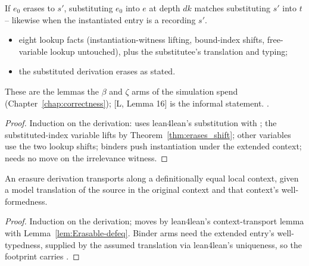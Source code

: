 \begin{theorem}
\label{thm:erases_subst}
\leanok
{}
 If $e_0$ erases to $s'$, substituting $e_0$ into $e$ at depth $\mathit{dk}$ matches substituting $s'$ into $t$ -- likewise when the instantiated entry is a  recording $s'$.
\begin{itemize}
\item {} eight lookup facts (instantiation-witness lifting, bound-index shifts, free-variable lookup untouched), plus the substitutee's translation and typing;
\item {} the substituted derivation erases as stated.
\end{itemize}
 These are the lemmas the $\beta$ and $\zeta$ arms of the simulation spend (Chapter~\ref{chap:correctness}); [L, Lemma 16] is the informal statement.
 \stProved{}.
\end{theorem}
\begin{proof}
\leanok
{}
 Induction on the derivation:  uses lean4lean's substitution with
; the substituted-index variable lifts by Theorem~\ref{thm:erases_shift};
other variables use the two lookup shifts; binders push instantiation under the extended
context;  needs no move on the irrelevance witness.
\end{proof}

\begin{lemma}
\label{lem:Erases-defeqDFC_wt}
\leanok
{}
 An erasure derivation transports along a definitionally equal local context, given a model translation of the source in the original context and that context's well-formedness.
\end{lemma}
\begin{proof}
\leanok
{}
 Induction on the derivation;  moves by lean4lean's context-transport
lemma with Lemma~\ref{lem:Erasable-defeq}. Binder arms need the extended entry's
well-typedness, supplied by the assumed translation via lean4lean's uniqueness, so the
footprint carries .
\end{proof}

